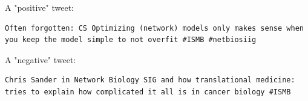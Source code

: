 \documentclass[a4paper,10pt]{article}
\begin{document}
A "positive" tweet:
\begin{lstlisting}
Often forgotten: CS Optimizing (network) models only makes sense when you keep the model simple to not overfit #ISMB #netbiosiig
\end{lstlisting}

A "negative" tweet:
\begin{lstlisting}
Chris Sander in Network Biology SIG and how translational medicine: tries to explain how complicated it all is in cancer biology #ISMB
\end{lstlisting}
\end{document}
